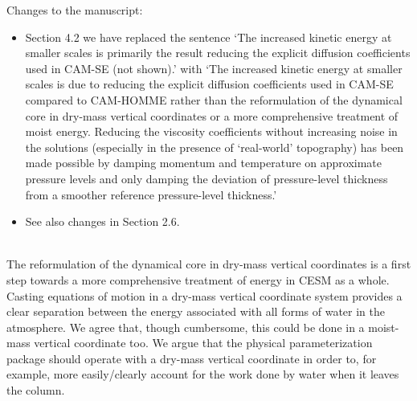 \documentclass[11pt]{article}
\begin{document}
Changes to the manuscript: 
\begin{itemize}
\item Section 4.2 we have replaced the sentence `The increased kinetic energy at smaller scales is primarily the result reducing the explicit diffusion coefficients used in CAM-SE (not shown).' with `The increased kinetic energy at smaller scales is due to reducing the explicit diffusion coefficients used in CAM-SE compared to CAM-HOMME rather than the reformulation of the dynamical core in dry-mass vertical coordinates or a more comprehensive treatment of moist energy. Reducing the viscosity coefficients without increasing noise in the solutions (especially in the presence of `real-world' topography) has been made possible by damping momentum and temperature on approximate pressure levels and only damping the deviation of pressure-level thickness from a smoother reference pressure-level thickness.'
\item See also changes in Section 2.6.
\end{itemize}

{\color{blue}{
While interesting from a design standpoint, I am not convinced that the change from moist-mass to a dry-mass vertical coordinate represents an improvement to the model, despite the great effort that would be required for this change, inside and outside of the core. The main justification given is that it makes a number of parts of the model ``easier'', although it is not clear that this is the case. While it may eliminate the need to rescale tracer masses, now the mass effect of water vapor and the condensates needs to be explicitly added in when computing the pressure-gradient force, among other considerations. It is also mentioned in Section 4.2 that many parts of the physics would need to be re-written to work with dry mass; most notably, the use of dry mass leads to the inequality of the hydrostatic assumption in (47), which is a very common assumption in models (presumably more common than the assumption that pressure surfaces do not change). }}\\

The reformulation of the dynamical core in dry-mass vertical coordinates is a first step towards a more comprehensive treatment of energy in CESM as a whole. Casting equations of motion in a dry-mass vertical coordinate system provides a clear separation between the energy associated with all forms of water in the atmosphere. We agree that, though cumbersome, this could be done in a moist-mass vertical coordinate too. We argue that the physical parameterization package should operate with a dry-mass vertical coordinate in order to, for example, more easily/clearly account for the work done by water when it leaves the column.\\
\end{document}
